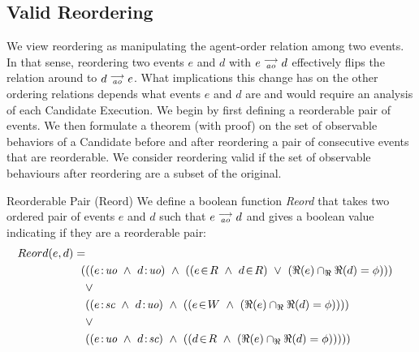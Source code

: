 

\subsection{Valid Reordering}
    
    We view reordering as manipulating the agent-order relation among two events. In that sense, reordering two events $e$ and $d$ with $e\stackrel{\longrightarrow}{_{\textit{ao}}}d$ effectively flips the relation around to $d\stackrel{\longrightarrow}{_{\textit{ao}}}e$.
    What implications this change has on the other ordering relations depends what events $e$ and $d$ are and would require an analysis of each Candidate Execution. We begin by first defining a reorderable pair of events. We then formulate a theorem (with proof) on the set of observable behaviors of a Candidate before and after reordering a pair of consecutive events that are reorderable. We consider reordering valid if the set of observable behaviours after reordering are a subset of the original. 
    
    \begin{definition}{Reorderable Pair (Reord)} \label{def:reord}
        We define a boolean function \emph{Reord} that takes two ordered pair of events $e$ and $d$ such that $e\stackrel{\longrightarrow}{_{\textit{ao}}}d$ and gives a boolean value indicating if they are a reorderable pair:
         \begin{align*}
            Reord(e,d) = \\
            (
            &((\et{e}{uo} \ \wedge \ \et{d}{uo}) \ \wedge \ 
                    (   
                        (\event{e}{R} \ \wedge \ \event{d}{R}) \ \vee \ 
                        (\Re(e) \cap_\Re \Re(d) = \phi) 
                    )
            ) \\ &\vee \\
            &((\et{e}{sc} \ \wedge \ \et{d}{uo}) \ \wedge \ 
                    (
                        (\event{e}{W} \ \wedge \ (\Re(e) \cap_\Re \Re(d) = \phi)) 
                    )
            ) \\ &\vee \\
            &((\et{e}{uo} \ \wedge \ \et{d}{sc}) \ \wedge \ 
                    (
                        (\event{d}{R} \ \wedge \ (\Re(e) \cap_\Re \Re(d) = \phi)) 
                    )
            )
            )
        \end{align*}
    \end{definition}

